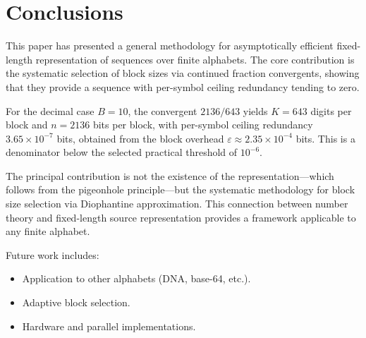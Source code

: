 \documentclass[10pt, conference]{IEEEtran}
\begin{document}
\section{Conclusions}

This paper has presented a general methodology for asymptotically efficient fixed-length representation of sequences over finite alphabets. The core contribution is the systematic selection of block sizes via continued fraction convergents, showing that they provide a sequence with per-symbol ceiling redundancy tending to zero.

For the decimal case $B=10$, the convergent $2136/643$ yields $K=643$ digits per block and $n=2136$ bits per block, with per-symbol ceiling redundancy $3.65\times10^{-7}$ bits, obtained from the block overhead $\varepsilon \approx 2.35\times10^{-4}$ bits. This is a denominator below the selected practical threshold of $10^{-6}$.

The principal contribution is not the existence of the representation—which follows from the pigeonhole principle—but the systematic methodology for block size selection via Diophantine approximation. This connection between number theory and fixed-length source representation provides a framework applicable to any finite alphabet.

Future work includes:
\begin{itemize}
    \item Application to other alphabets (DNA, base-64, etc.).
    \item Adaptive block selection.
    \item Hardware and parallel implementations.
\end{itemize}
\end{document}
